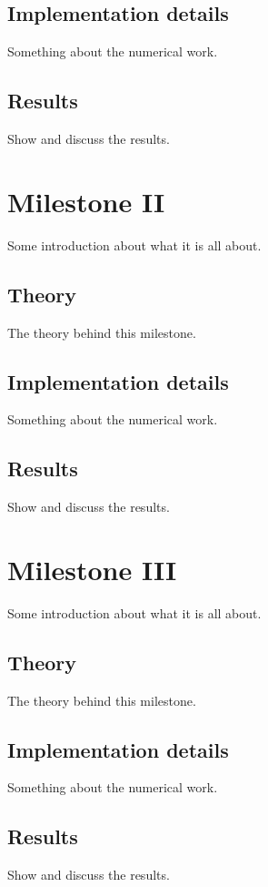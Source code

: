 \documentclass{aa}
\begin{document}
\subsection{Implementation details}
Something about the numerical work.

\subsection{Results}
Show and discuss the results.

\section{Milestone II}
Some introduction about what it is all about.

\subsection{Theory}
The theory behind this milestone.

\subsection{Implementation details}
Something about the numerical work.

\subsection{Results}
Show and discuss the results.

\section{Milestone III}
Some introduction about what it is all about.

\subsection{Theory}
The theory behind this milestone.

\subsection{Implementation details}
Something about the numerical work.

\subsection{Results}
Show and discuss the results.
\end{document}
